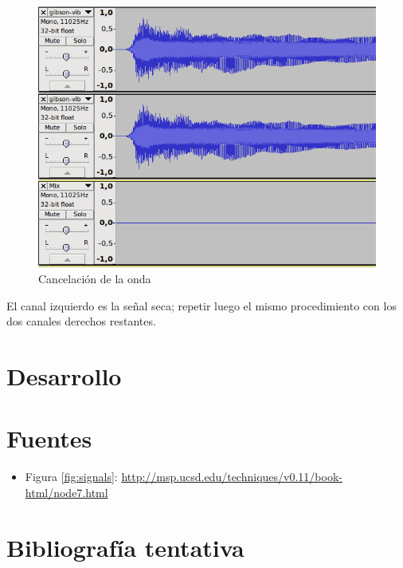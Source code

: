 \documentclass[a4paper,spanish,12pt]{article}
\begin{document}
\begin{figure}[H]
    \centering
    \includegraphics[scale=0.70]{imagenes/audacity-no-wave.png}
    \caption{Cancelación de la onda}
    \label{fig:audacity-no-wave}
\end{figure}

El canal izquierdo es la señal seca; repetir luego el mismo procedimiento con los dos canales derechos restantes.

\newpage\section{Desarrollo}

\newpage\section{Fuentes}
\begin{itemize}
\item Figura \ref{fig:signals}: \url{http://msp.ucsd.edu/techniques/v0.11/book-html/node7.html}
\end{itemize}

\newpage\section{Bibliografía tentativa}
\end{document}
